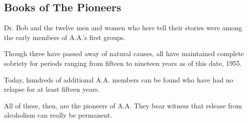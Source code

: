 
\onecolumn

\begin{centering}
\part*{Books of The Pioneers}
\end{centering}

\begin{bibelchapter}
    Dr. Bob and the twelve men and women who here tell their stories 
    were among the early members of A.A.’s first groups.

\verse Though three have passed away of natural causes, 
    all have maintained complete sobriety 
    for periods ranging from fifteen to nineteen years 
    as of this date, 1955.

\verse Today, hundreds of additional A.A. members can be found 
    who have had no relapse for at least fifteen years.

\verse All of these, then, are the pioneers of A.A. 
\verse They bear witness that 
    release from alcoholism can really be permanent.

\end{bibelchapter}

\twocolumn

\fancyhead[RO,LE]{\textbf{\headings{\Large \rightmark}}}
\fancyhfoffset[RO]{1pt}

\setcolsepandrule{0.1875in}{0pt}
\setlength\textwidth{5.1125in}
\setlength\columnwidth{2.4625in}
\setlength\columnsep{0.1875in}
\checkandfixthelayout 

